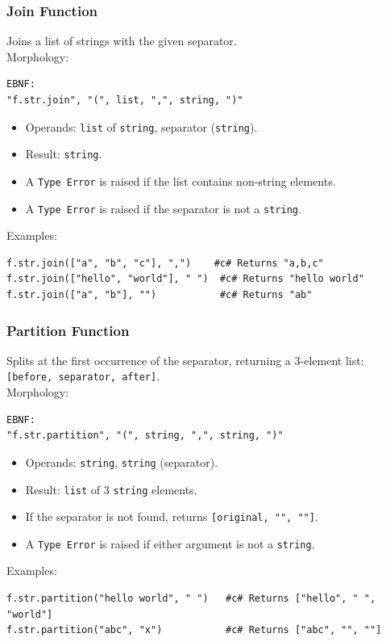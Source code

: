 \subsubsection{Join Function}
Joins a list of strings with the given separator. \\
Morphology:
\begin{verbatim}
EBNF:
"f.str.join", "(", list, ",", string, ")"
\end{verbatim}
\begin{itemize}
\item Operands: \texttt{list} of \texttt{string}, separator (\texttt{string}).
\item Result: \texttt{string}.
\item A \texttt{Type Error} is raised if the list contains non-string elements.
\item A \texttt{Type Error} is raised if the separator is not a \texttt{string}.
\end{itemize}
Examples:
\begin{verbatim}
f.str.join(["a", "b", "c"], ",")    #c# Returns "a,b,c"
f.str.join(["hello", "world"], " ")  #c# Returns "hello world"
f.str.join(["a", "b"], "")           #c# Returns "ab"
\end{verbatim}

\subsubsection{Partition Function}
Splits at the first occurrence of the separator, returning a 3-element list: \texttt{[before, separator, after]}. \\
Morphology:
\begin{verbatim}
EBNF:
"f.str.partition", "(", string, ",", string, ")"
\end{verbatim}
\begin{itemize}
\item Operands: \texttt{string}, \texttt{string} (separator).
\item Result: \texttt{list} of 3 \texttt{string} elements.
\item If the separator is not found, returns \texttt{[original, "", ""]}.
\item A \texttt{Type Error} is raised if either argument is not a \texttt{string}.
\end{itemize}
Examples:
\begin{verbatim}
f.str.partition("hello world", " ")   #c# Returns ["hello", " ", "world"]
f.str.partition("abc", "x")           #c# Returns ["abc", "", ""]
\end{verbatim}

